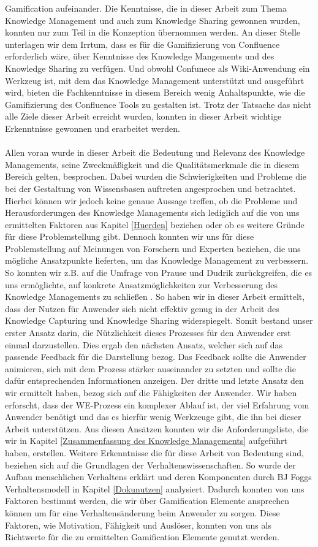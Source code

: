 \documentclass[a4paper,12pt,twoside]{scrartcl}
\begin{document}
Gamification aufeinander. Die Kenntnisse, die in dieser Arbeit zum Thema Knowledge Management und auch zum Knowledge Sharing gewonnen wurden, konnten nur zum Teil in die Konzeption übernommen werden. An dieser Stelle unterlagen wir dem Irrtum, dass es für die Gamifizierung von Confluence erforderlich wäre, über Kenntnisse des Knowledge Mangements und des Knowledge Sharing zu verfügen. Und obwohl Confunece als Wiki-Anwendung ein Werkzeug ist, mit dem das Knowledge Management unterstützt und ausgeführt wird, bieten die Fachkenntnisse in diesem Bereich wenig Anhaltspunkte, wie die Gamifizierung des Confluence Tools zu gestalten ist. Trotz der Tatsache das nicht alle Ziele dieser Arbeit erreicht wurden, konnten in dieser Arbeit wichtige Erkenntnisse gewonnen und erarbeitet werden.   
\\\\
Allen voran wurde in dieser Arbeit die Bedeutung und Relevanz des Knowledge Managements, seine Zweckmäßigkeit und die Qualitätsmerkmale die in diesem Bereich gelten, besprochen. Dabei wurden die Schwierigkeiten und Probleme die bei der Gestaltung von Wissensbasen auftreten angesprochen und betrachtet. Hierbei können wir jedoch keine genaue Aussage treffen, ob die Probleme und Herausforderungen des Knowledge Managements sich lediglich auf die von uns ermittelten Faktoren aus Kapitel \ref{Huerden} beziehen oder ob es weitere Gründe für diese Problemstellung gibt. Dennoch konnten wir uns für diese Problemstellung auf Meinungen von Forschern und Experten beziehen, die uns mögliche Ansatzpunkte lieferten, um das Knowledge Management zu verbessern. So konnten wir z.B. auf die Umfrage von Prause und Dudrik zurückgreifen, die es uns ermöglichte, auf konkrete Ansatzmöglichkeiten zur Verbesserung des Knowledge Managements zu schließen \cite{Prause2012}. So haben wir in dieser Arbeit ermittelt, dass der Nutzen für Anwender sich nicht effektiv genug in der Arbeit des Knowledge Capturing und Knowledge Sharing widerspiegelt. Somit bestand unser erster Ansatz darin, die Nützlichkeit dieses Prozesses für den Anwender erst einmal darzustellen. Dies ergab den nächsten Ansatz, welcher sich auf das passende Feedback für die Darstellung bezog. Das Feedback sollte die Anwender animieren, sich mit dem Prozess stärker auseinander zu setzten und sollte die dafür entsprechenden Informationen anzeigen. Der dritte und letzte Ansatz den wir ermittelt haben, bezog sich auf die Fähigkeiten der Anwender. Wir haben erforscht, dass der WE-Prozess ein komplexer Ablauf ist, der viel Erfahrung vom Anwender benötigt und das es hierfür wenig Werkzeuge gibt, die ihn bei dieser Arbeit unterstützen. Aus diesen Ansätzen konnten wir die Anforderungsliste, die wir in Kapitel \ref{Zusammenfassung des Knowledge Managements} aufgeführt haben, erstellen. Weitere Erkenntnisse die für diese Arbeit von Bedeutung sind, beziehen sich auf die Grundlagen der Verhaltenswissenschaften. So wurde der Aufbau menschlichen Verhaltens erklärt und deren Komponenten durch BJ Foggs Verhaltensmodell in Kapitel \ref{Dokunutzen} analysiert. Dadurch konnten von uns Faktoren bestimmt werden, die wir über Gamification Elemente ansprechen können um für eine Verhaltensänderung beim Anwender zu sorgen. Diese Faktoren, wie Motivation, Fähigkeit und Auslöser, konnten von uns als Richtwerte für die zu ermittelten Gamification Elemente genutzt werden. 
\end{document}
